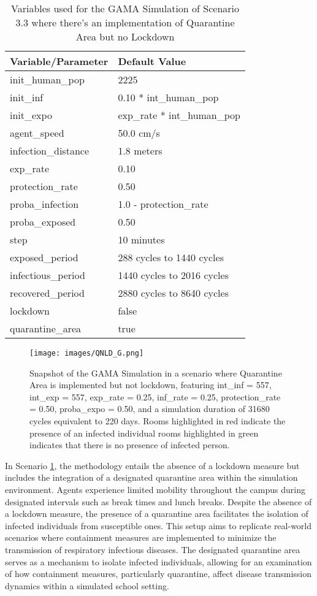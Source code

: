\begin{table}[H]
	\centering
	\begin{tabular}{ll}
		\toprule
		\textbf{Variable/}\textbf{Parameter} & \textbf{Default Value}\\
		\hline
		init\_human\_pop & 2225\\
		init\_inf & 0.10 * int\_human\_pop\\
		init\_expo & exp\_rate * int\_human\_pop \\
		agent\_speed & 50.0 cm/s\\
		infection\_distance & 1.8 meters\\
		exp\_rate & 0.10\\
		protection\_rate & 0.50\\
		proba\_infection & 1.0 - protection\_rate\\
		proba\_exposed & 0.50\\
		step & 10 minutes\\
		exposed\_period & 288 cycles to 1440 cycles\\
		infectious\_period & 1440 cycles to 2016 cycles\\
		recovered\_period & 2880 cycles to 8640 cycles\\ 
		lockdown & false\\
		quarantine\_area & true\\
		\bottomrule
	\end{tabular}
	\caption{Variables used for the GAMA Simulation of Scenario 3.3 where there's an implementation of Quarantine Area but no Lockdown}
	\label{3.2B}
\end{table}
		\begin{figure}[H]
	\centering
	\texttt{[image: images/QNLD\_G.png]}
	\caption{Snapshot of the GAMA Simulation in a scenario where Quarantine Area is implemented but not lockdown, featuring int\_inf = 557, int\_exp = 557, exp\_rate = 0.25, inf\_rate = 0.25, protection\_rate = 0.50, proba\_expo = 0.50, and a simulation duration of 31680 cycles equivalent to 220 days. Rooms highlighted in red indicate the presence of an infected individual rooms highlighted in green indicates that there is no presence of infected person.}
	\label{3.3G}
\end{figure}
In Scenario \ref{3.2B}, the methodology entails the absence of a lockdown measure but includes the integration of a designated quarantine area within the simulation environment. Agents experience limited mobility throughout the campus during designated intervals such as break times and lunch breaks. Despite the absence of a lockdown measure, the presence of a quarantine area facilitates the isolation of infected individuals from susceptible ones. This setup aims to replicate real-world scenarios where containment measures are implemented to minimize the transmission of respiratory infectious diseases. The designated quarantine area serves as a mechanism to isolate infected individuals, allowing for an examination of how containment measures, particularly quarantine, affect disease transmission dynamics within a simulated school setting.

